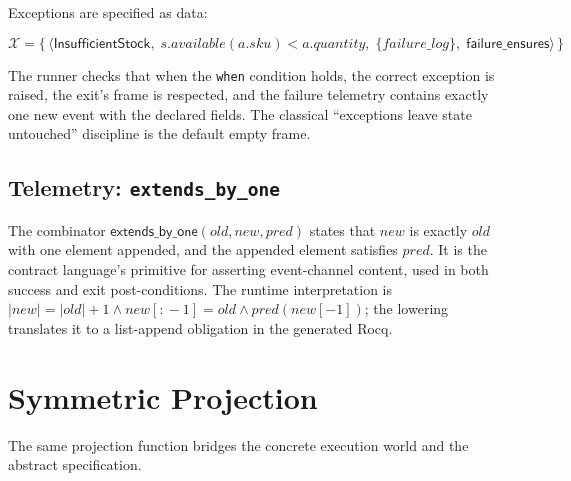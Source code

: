 \documentclass[11pt,a4paper]{article}
\begin{document}
Exceptions are specified as data:

\[
\mathcal{X} = \bigl\{\,
\langle \mathsf{InsufficientStock},\;
       s.\mathit{available}(a.\mathit{sku}) < a.\mathit{quantity},\;
       \{\mathit{failure\_log}\},\;
       \mathsf{failure\_ensures}
\rangle \,\bigr\}
\]

The runner checks that when the \texttt{when} condition holds, the
correct exception is raised, the exit's frame is respected, and the
failure telemetry contains exactly one new event with the declared
fields.  The classical ``exceptions leave state untouched'' discipline
is the default empty frame.

\subsection{Telemetry: \texttt{extends\_by\_one}}

The combinator $\mathsf{extends\_by\_one}(\mathit{old}, \mathit{new},
\mathit{pred})$ states that $\mathit{new}$ is exactly $\mathit{old}$
with one element appended, and the appended element satisfies
$\mathit{pred}$.  It is the contract language's primitive for
asserting event-channel content, used in both success and exit
post-conditions.  The runtime interpretation is
$|\mathit{new}| = |\mathit{old}| + 1 \land \mathit{new}[:\!-1] =
\mathit{old} \land \mathit{pred}(\mathit{new}[-1])$; the lowering
translates it to a list-append obligation in the generated Rocq.

\section{Symmetric Projection}\label{sec:architecture}

The same projection function bridges the concrete execution world
and the abstract specification.
\end{document}
